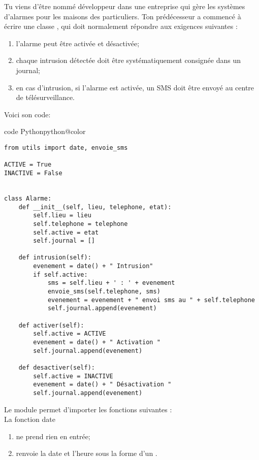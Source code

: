 \documentclass[a4paper,10pt,french]{book}
\begin{document}


Tu viens d'être nommé développeur dans une entreprise qui gère les systèmes d'alarmes pour les maisons des particuliers.
Ton prédécesseur a commencé à écrire une classe , qui doit normalement répondre aux exigences suivantes :

\begin{enumerate}[--]
	\item 	l'alarme peut être activée et désactivée;
	\item 	chaque intrusion détectée doit être systématiquement consignée dans un journal;
    \item   en cas d'intrusion, si l'alarme est activée, un SMS doit être envoyé au centre de télésurveillance.
\end{enumerate}

Voici son code:

\begin{encadrecolore}{code Python}{python@color}
\begin{verbatim}
from utils import date, envoie_sms

ACTIVE = True
INACTIVE = False


class Alarme:
    def __init__(self, lieu, telephone, etat):
        self.lieu = lieu
        self.telephone = telephone
        self.active = etat
        self.journal = []

    def intrusion(self):
        evenement = date() + " Intrusion"
        if self.active:
            sms = self.lieu + ' : ' + evenement
            envoie_sms(self.telephone, sms)
            evenement = evenement + " envoi sms au " + self.telephone
            self.journal.append(evenement)

    def activer(self):
        self.active = ACTIVE
        evenement = date() + " Activation "
        self.journal.append(evenement)

    def desactiver(self):
        self.active = INACTIVE
        evenement = date() + " Désactivation "
        self.journal.append(evenement)
\end{verbatim}
\end{encadrecolore}

Le module  permet d'importer les fonctions suivantes :\\

La fonction date 
\begin{enumerate}[\textbullet]
	\item 	ne prend rien en entrée;
	\item 	renvoie la date et l'heure sous la forme d'un .
\end{enumerate}
\end{document}
